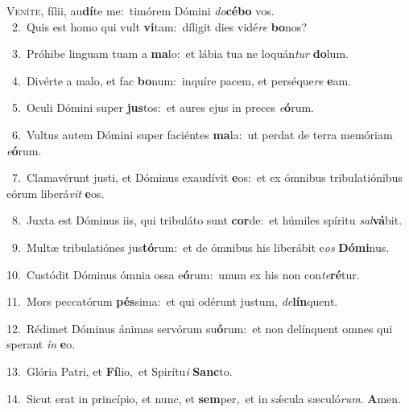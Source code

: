 \lettrine{\initial\textcolor{\initialcolor}{V}}{eníte,} fílii, au\-\textbf{dí}\-te me:~\star timórem Dómini \textit{do}\-\textbf{cé}\textbf{bo} vos.\\
{\numbfont\textcolor{\numbcolor}{~2.}}~Quis est homo qui vult \textbf{vi}\-tam:~\star díligit dies vidé\textit{re} \textbf{bo}\-nos?\par
{\numbfont\textcolor{\numbcolor}{~3.}}~Próhibe linguam tuam a \textbf{ma}\-lo:~\star et lábia tua ne loquán\textit{tur} \textbf{do}\-lum.\par
{\numbfont\textcolor{\numbcolor}{~4.}}~Divérte a malo, et fac \textbf{bo}\-num:~\star inquíre pacem, et perséque\textit{re} \textbf{e}\-am.\par
{\numbfont\textcolor{\numbcolor}{~5.}}~Oculi Dómini super \textbf{jus}\-tos:~\star et aures ejus in preces \textit{e}\-\textbf{ó}rum.\par
{\numbfont\textcolor{\numbcolor}{~6.}}~Vultus autem Dómini super faciéntes \textbf{ma}\-la:~\star ut perdat de terra memóriam \textit{e}\-\textbf{ó}rum.\par
{\numbfont\textcolor{\numbcolor}{~7.}}~Clamavérunt justi, et Dóminus exaudívit \textbf{e}\-os:~\star et ex ómnibus tribulatiónibus eórum liberá\textit{vit} \textbf{e}\-os.\par
{\numbfont\textcolor{\numbcolor}{~8.}}~Juxta est Dóminus iis, qui tribuláto sunt \textbf{cor}\-de:~\star et húmiles spíritu \textit{sal}\-\textbf{vá}bit.\par
{\numbfont\textcolor{\numbcolor}{~9.}}~Multæ tribulatiónes jus\-\textbf{tó}\-rum:~\star et de ómnibus his liberábit e\textit{os} \textbf{Dó}\-\textbf{mi}nus.\par
{\numbfont\textcolor{\numbcolor}{10.}}~Custódit Dóminus ómnia ossa e\-\textbf{ó}\-rum:~\star unum ex his non con\-\textit{te}\-\textbf{ré}tur.\par
{\numbfont\textcolor{\numbcolor}{11.}}~Mors peccatórum \textbf{pés}\-sima:~\star et qui odérunt justum, \textit{de}\-\textbf{lín}quent.\par
{\numbfont\textcolor{\numbcolor}{12.}}~Rédimet Dóminus ánimas servórum su\-\textbf{ó}\-rum:~\star et non delínquent omnes qui sperant \textit{in} \textbf{e}\-o.\par
{\numbfont\textcolor{\numbcolor}{13.}}~Glória Patri, et \textbf{Fí}\-lio,~\star et Spirítu\textit{i} \textbf{Sanc}\-to.\par
{\numbfont\textcolor{\numbcolor}{14.}}~Sicut erat in princípio, et nunc, et \textbf{sem}\-per,~\star et in sǽcula sæculó\-\textit{rum}\-. \textbf{A}\-men.\par
